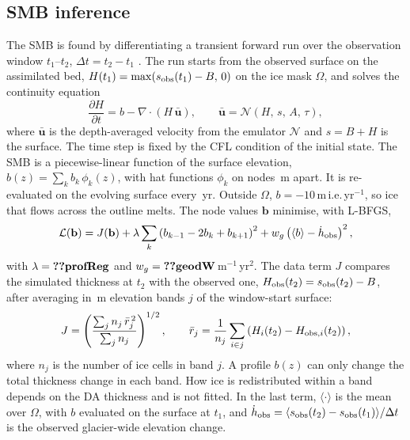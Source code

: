\documentclass[10pt,a4paper]{article}
\newcommand{\mie}{m\,i.e.\,yr$^{-1}$}
\begin{document}
\subsection{SMB inference}
The SMB is found by differentiating a transient forward run over the observation window $t_1$--$t_2$,
$\Delta t=t_2-t_1$ \citep{lleshi}. The run starts from the observed surface on the assimilated bed,
$H(t_1)=\max(s_{\rm obs}(t_1)-B,\,0)$ on the ice mask $\Omega$, and solves the continuity equation
\begin{equation}
\frac{\partial H}{\partial t} = b - \nabla\cdot\left(H\,\bar{\mathbf u}\right),\qquad
\bar{\mathbf u}=\mathcal N(H,\,s,\,A,\,\tau),
\label{eq:cont}
\end{equation}
where $\bar{\mathbf u}$ is the depth-averaged velocity from the emulator $\mathcal N$ and $s=B+H$ is the surface. The time
step is fixed by the CFL condition of the initial state. The SMB is a piecewise-linear function of the surface elevation,
$b(z)=\sum_k b_k\,\phi_k(z)$, with hat functions $\phi_k$ on nodes \,m apart. It is re-evaluated on the evolving
surface every \,yr. Outside $\Omega$, $b=-10$\,\mie, so ice that flows across the outline melts. The node values
$\mathbf b$ minimise, with L-BFGS,
\begin{equation}
\mathcal L(\mathbf b) = J(\mathbf b)
 + \lambda\sum_k\left(b_{k-1}-2b_k+b_{k+1}\right)^2
 + w_g\left(\langle b\rangle - \dot h_{\rm obs}\right)^2 ,
\label{eq:loss}
\end{equation}
with $\lambda=\V{profReg}$ and $w_g=\V{geodW}$\,m$^{-1}$\,yr$^2$. The data term $J$ compares the simulated thickness at
$t_2$ with the observed one, $H_{\rm obs}(t_2)=s_{\rm obs}(t_2)-B$, after averaging in \,m elevation bands $j$
of the window-start surface:
\begin{equation}
J = \left(\frac{\sum_j n_j\,\bar r_j^{\,2}}{\sum_j n_j}\right)^{1/2},\qquad
\bar r_j = \frac{1}{n_j}\sum_{i\in j}\left(H_i(t_2)-H_{{\rm obs},i}(t_2)\right),
\label{eq:band}
\end{equation}
where $n_j$ is the number of ice cells in band $j$. A profile $b(z)$ can only change the total thickness change in each
band. How ice is redistributed within a band depends on the DA thickness and is not fitted. In the last term,
$\langle\cdot\rangle$ is the mean over $\Omega$, with $b$ evaluated on the surface at $t_1$, and
$\dot h_{\rm obs}=\langle s_{\rm obs}(t_2)-s_{\rm obs}(t_1)\rangle/\Delta t$ is the observed glacier-wide elevation change.
\end{document}
